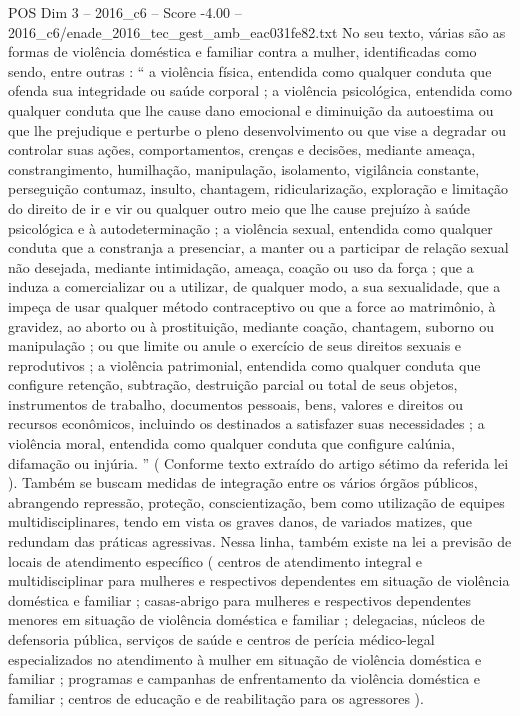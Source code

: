 \begin{textsample}{POS Dim 3 – 2016\_c6 – Score -4.00 – 2016\_c6/enade\_2016\_tec\_gest\_amb\_eac031fe82.txt}
No seu texto, várias são as formas de violência doméstica e familiar contra a mulher, identificadas como sendo, entre outras : “ a violência física, entendida como qualquer conduta que ofenda sua integridade ou saúde corporal ; a violência psicológica, entendida como qualquer conduta que lhe cause dano emocional e diminuição da autoestima ou que lhe prejudique e perturbe o pleno desenvolvimento ou que vise a degradar ou controlar suas ações, comportamentos, crenças e decisões, mediante ameaça, constrangimento, humilhação, manipulação, isolamento, vigilância constante, perseguição contumaz, insulto, chantagem, ridicularização, exploração e limitação do direito de ir e vir ou qualquer outro meio que lhe cause prejuízo à saúde psicológica e à autodeterminação ; a violência sexual, entendida como qualquer conduta que a constranja a presenciar, a manter ou a participar de relação sexual não desejada, mediante intimidação, ameaça, coação ou uso da força ; que a induza a comercializar ou a utilizar, de qualquer modo, a sua sexualidade, que a impeça de usar qualquer método contraceptivo ou que a force ao matrimônio, à gravidez, ao aborto ou à prostituição, mediante coação, chantagem, suborno ou manipulação ; ou que limite ou anule o exercício de seus direitos sexuais e reprodutivos ; a violência patrimonial, entendida como qualquer conduta que configure retenção, subtração, destruição parcial ou total de seus objetos, instrumentos de trabalho, documentos pessoais, bens, valores e direitos ou recursos econômicos, incluindo os destinados a satisfazer suas necessidades ; a violência moral, entendida como qualquer conduta que configure calúnia, difamação ou injúria. ” ( Conforme texto extraído do artigo sétimo da referida lei ).
Também se buscam medidas de integração entre os vários órgãos públicos, abrangendo repressão, proteção, conscientização, bem como utilização de equipes multidisciplinares, tendo em vista os graves danos, de variados matizes, que redundam das práticas agressivas.
Nessa linha, também existe na lei a previsão de locais de atendimento específico ( centros de atendimento integral e multidisciplinar para mulheres e respectivos dependentes em situação de violência doméstica e familiar ; casas-abrigo para mulheres e respectivos dependentes menores em situação de violência doméstica e familiar ; delegacias, núcleos de defensoria pública, serviços de saúde e centros de perícia médico-legal especializados no atendimento à mulher em situação de violência doméstica e familiar ; programas e campanhas de enfrentamento da violência doméstica e familiar ; centros de educação e de reabilitação para os agressores ).

\end{textsample}

